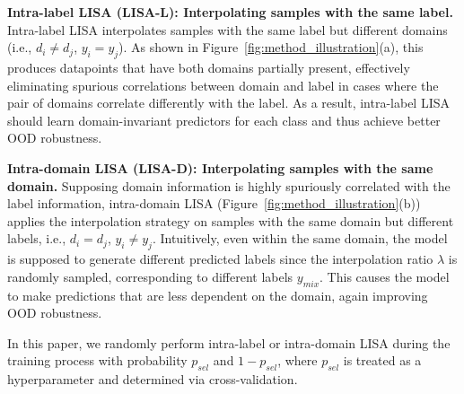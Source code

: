 \noindent \textbf{Intra-label LISA (LISA-L): Interpolating samples with the same label.}
Intra-label LISA interpolates samples with the same label but different domains (i.e., $d_i \neq d_j$, $y_i=y_j$). As shown in Figure~\ref{fig:method_illustration}(a), this produces datapoints that have both domains partially present, effectively eliminating spurious correlations between domain and label in cases where the pair of domains correlate differently with the label. As a result, intra-label LISA should learn domain-invariant predictors for each class and thus achieve better OOD robustness. 

\noindent \textbf{Intra-domain LISA (LISA-D): Interpolating samples with the same domain.}
Supposing domain information is highly spuriously correlated with the label information, intra-domain LISA (Figure~\ref{fig:method_illustration}(b)) applies the interpolation strategy on samples with the same domain but different labels, i.e., $d_i=d_j$, $y_i\neq y_j$. Intuitively, even within the same domain, the model is supposed to generate different predicted labels since the interpolation ratio $\lambda$ is randomly sampled, corresponding to different labels $y_{mix}$. This causes the model to make predictions that are less dependent on the domain, again improving OOD robustness.

In this paper, we randomly perform intra-label or intra-domain LISA during the training process with probability $p_{sel}$ and $1-p_{sel}$, where $p_{sel}$ is treated as a hyperparameter and determined via cross-validation. 


